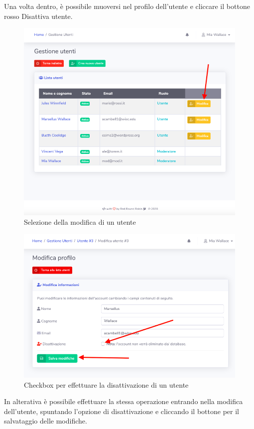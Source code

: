 		Una volta dentro, è possibile muoversi nel profilo dell'utente e cliccare il bottone rosso Disattiva utente.
		\begin{figure}[H]
		\centering
		\includegraphics[scale=0.600]{res/images/mod/selModUtente.png}
		\caption{Selezione della modifica di un utente}
	\end{figure}
		\begin{figure}[H]
		\centering
		\includegraphics[scale=0.600]{res/images/mod/disattUtente.png}
		\caption{Checkbox per effettuare la disattivazione di un utente}
	\end{figure}
		In alterativa è possibile effettuare la stessa operazione entrando nella modifica dell'utente, spuntando l'opzione di disattivazione e cliccando il bottone per il salvataggio delle modifiche. 
